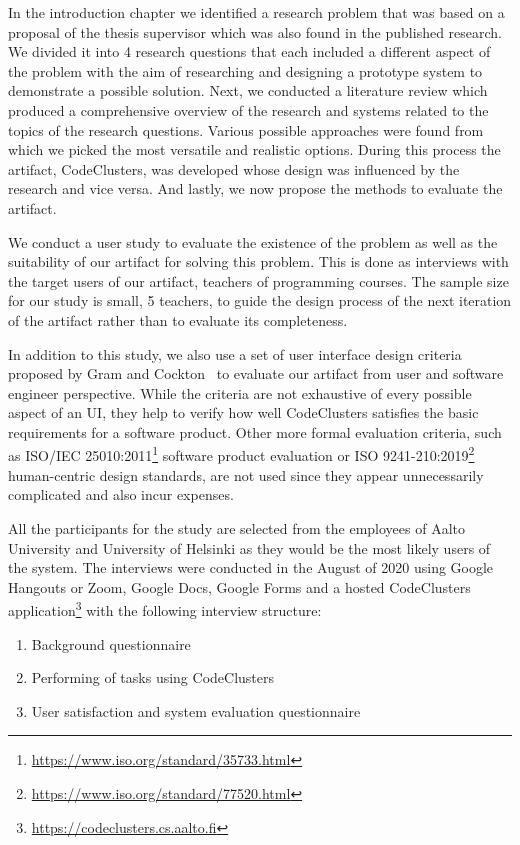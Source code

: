 In the introduction chapter we identified a research problem that was based on a proposal of the thesis supervisor which was also found in the published research. We divided it into 4 research questions that each included a different aspect of the problem with the aim of researching and designing a prototype system to demonstrate a possible solution. Next, we conducted a literature review which produced a comprehensive overview of the research and systems related to the topics of the research questions. Various possible approaches were found from which we picked the most versatile and realistic options. During this process the artifact, CodeClusters, was developed whose design was influenced by the research and vice versa. And lastly, we now propose the methods to evaluate the artifact.

We conduct a user study to evaluate the existence of the problem as well as the suitability of our artifact for solving this problem. This is done as interviews with the target users of our artifact, teachers of programming courses. The sample size for our study is small, 5 teachers, to guide the design process of the next iteration of the artifact rather than to evaluate its completeness.

In addition to this study, we also use a set of user interface design criteria proposed by Gram and Cockton~\cite{drs-drm, drs-gram-cockton-1996} to evaluate our artifact from user and software engineer perspective. While the criteria are not exhaustive of every possible aspect of an UI, they help to verify how well CodeClusters satisfies the basic requirements for a software product. Other more formal evaluation criteria, such as ISO/IEC 25010:2011\footnote{\url{https://www.iso.org/standard/35733.html}} software product evaluation or ISO 9241-210:2019\footnote{\url{https://www.iso.org/standard/77520.html}} human-centric design standards, are not used since they appear unnecessarily complicated and also incur expenses.

All the participants for the study are selected from the employees of Aalto University and University of Helsinki as they would be the most likely users of the system. The interviews were conducted in the August of 2020 using Google Hangouts or Zoom, Google Docs, Google Forms and a hosted CodeClusters application\footnote{\url{https://codeclusters.cs.aalto.fi}} with the following interview structure:

\begin{enumerate}
  \item Background questionnaire
  \item Performing of tasks using CodeClusters
  \item User satisfaction and system evaluation questionnaire
\end{enumerate}

